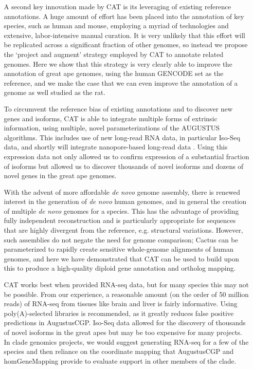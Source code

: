\documentclass[fleqn,10pt]{wlscirep}
\begin{document}
A second key innovation made by CAT is its leveraging of existing reference annotations. A huge amount of effort has been placed into the annotation of key species, such as human and mouse, employing a myriad of technologies and extensive, labor-intensive manual curation. It is very unlikely that this effort will be replicated across a significant fraction of other genomes, so instead we propose the `project and augment' strategy employed by CAT to annotate related genomes. Here we show that this strategy is very clearly able to improve the annotation of great ape genomes, using the human GENCODE set as the reference, and we make the case that we can even improve the annotation of a genome as well studied as the rat. 

To circumvent the reference bias of existing annotations and to discover new genes and isoforms, CAT is able to integrate multiple forms of extrinsic information, using multiple, novel parameterizations of the AUGUSTUS algorithms. This includes use of new long-read RNA data, in particular Iso-Seq data, and shortly will integrate nanopore-based long-read data \citep{byrne2017nanopore}. Using this expression data not only allowed us to confirm expression of a substantial fraction of isoforms but allowed us to discover thousands of novel isoforms and dozens of novel genes in the great ape genomes.

With the advent of more affordable \textit{de novo} genome assembly, there is renewed interest in the generation of \textit{de novo} human genomes, and in general the creation of multiple \textit{de novo} genomes for a species. This has the advantage of providing fully independent reconstruction and is particularly appropriate for sequences that are highly divergent from the reference, e.g. structural variations. However, such assemblies do not negate the need for genome comparison; Cactus can be parameterized to rapidly create sensitive whole-genome alignments of human genomes, and here we have demonstrated that CAT can be used to build upon this to produce a high-quality diploid gene annotation and ortholog mapping. 

CAT works best when provided RNA-seq data, but for many species this may not be possible. From our experience, a reasonable amount (on the order of 50 million reads) of RNA-seq from tissues like brain and liver is fairly informative. Using poly(A)-selected libraries is recommended, as it greatly reduces false positive predictions in AugustusCGP. Iso-Seq data allowed for the discovery of thousands of novel isoforms in the great apes but may be too expensive for many projects. In clade genomics projects, we would suggest generating RNA-seq for a few of the species and then reliance on the coordinate mapping that AugustusCGP and homGeneMapping provide to evaluate support in other members of the clade. 
\end{document}
